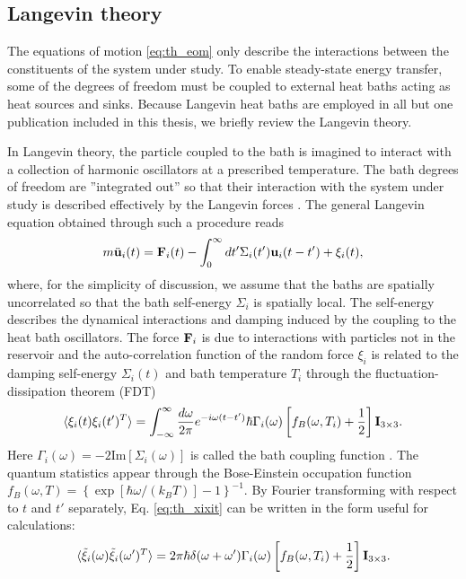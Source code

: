 \subsection{Langevin theory} 
\label{sec:th_langevin}
The equations of motion \eqref{eq:th_eom} only describe the interactions between the constituents of the system under study. To enable steady-state energy transfer, some of the degrees of freedom must be coupled to external heat baths acting as heat sources and sinks. Because Langevin heat baths are employed in all but one publication included in this thesis, we briefly review the Langevin theory.

In Langevin theory, the particle coupled to the bath is imagined to interact with a collection of harmonic oscillators at a prescribed temperature. The bath degrees of freedom are ''integrated out'' so that their interaction with the system under study is described effectively by the Langevin forces \cite{weiss}. The general Langevin equation obtained through such a procedure reads \cite{dhar06}
\begin{equation}
 m\ddot{\mathbf{u}}_i(t) =  \mathbf{F}_i(t) - \int_{0}^{\infty}dt' \Sigma_i(t') \mathbf{u}_i(t-t') + \xi_i(t), \label{eq:th_eom_langevin}
\end{equation}
where, for the simplicity of discussion, we assume that the baths are spatially uncorrelated so that the bath self-energy $\Sigma_i$ is spatially local. The self-energy describes the dynamical interactions and damping induced by the coupling to the heat bath oscillators. The force $\mathbf{F}_i$ is due to interactions with particles not in the reservoir and the auto-correlation function of the random force $\xi_i$ is related to the damping self-energy $\Sigma_i(t)$ and bath temperature $T_i$ through the fluctuation-dissipation theorem (FDT) \cite{dhar06}
\begin{equation}
 \langle \xi_i(t)\xi_i(t') ^T\rangle = \int_{-\infty}^{\infty} \frac{d\omega}{2\pi} e^{-i\omega(t-t')} \hbar \Gamma_i(\omega) \left[f_B(\omega,T_i)+\frac{1}{2}\right] \mathbf{I}_{3\times3}. \label{eq:th_xixit}
\end{equation}
Here $\Gamma_i(\omega)=-2\textrm{Im}[\Sigma_i(\omega)]$ is called the bath coupling function \cite{dhar06}. The quantum statistics appear through the Bose-Einstein occupation function $f_B(\omega,T)=\left\{\exp[\hbar\omega/(k_BT)]-1 \right\}^{-1}$. By Fourier transforming with respect to $t$ and $t'$ separately, Eq. \eqref{eq:th_xixit} can be written in the form useful for calculations:
\begin{equation}
  \langle\tilde  \xi_i(\omega)\tilde \xi_i(\omega')^T \rangle = 2\pi\hbar\delta(\omega+\omega') \Gamma_i(\omega) \left[f_B(\omega,T_i)+\frac{1}{2} \right] \mathbf{I}_{3\times3}. \label{eq:th_xixiom}
\end{equation}

